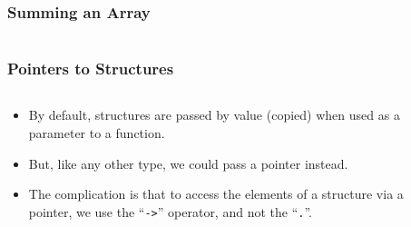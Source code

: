 
\begin{frame}[fragile]
\frametitle{Summing an Array}
\begin{columns}[T]

\begin{column}{0.30\textwidth}

\end{column}

\pause
\begin{column}{0.30\textwidth}

\end{column}

\pause
\begin{column}{0.30\textwidth}

\end{column}

\end{columns}
\end{frame}


\begin{frame}[fragile]
\frametitle{Pointers to Structures}
\begin{columns}[T]

\begin{column}{0.30\textwidth}
\begin{itemize}[<+->]
\item By default, structures are passed by value (copied) when used as a parameter to a function.
\item But, like any other type, we could pass a pointer instead.
\item The complication is that to access the elements of a structure via a pointer, we use the ``\verb^->^'' operator, and not the ``\verb^.^''.
\end{itemize}
\end{column}

\pause
\begin{column}{0.60\textwidth}

\end{column}

\end{columns}
\end{frame}


\endinput
